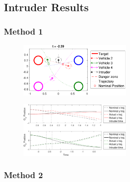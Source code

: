\subsection{Intruder Results \label{sec:basic_results}}
\subsubsection{Method 1}
\begin{figure}
  \centering
  \includegraphics[width=0.50\textwidth]{"fig/intruder1_traj"}
  \caption{}
  \label{fig:intruder1_traj}
\end{figure}

\begin{figure}
  \centering
  \includegraphics[width=0.50\textwidth]{"fig/intruder1_diff"}
  \caption{}
  \label{fig:intruder1_diff}
\end{figure}


\subsubsection{Method 2}